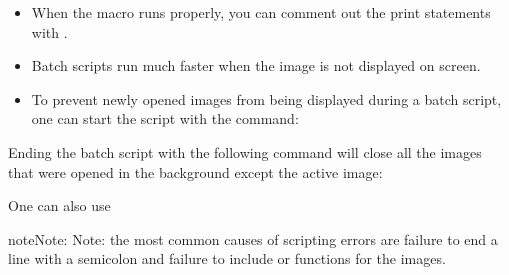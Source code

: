 \documentclass[letterpaper,10pt,english]{jupyterBook}
\begin{document}
\sphinxAtStartPar
{}
\begin{itemize}
\item {} 
\sphinxAtStartPar
When the macro runs properly, you can comment out the print statements with \sphinxcode{\sphinxupquote{//}}.

\item {} 
\sphinxAtStartPar
Batch scripts run much faster when the image is not displayed on screen.

\item {} 
\sphinxAtStartPar
To prevent newly opened images from being displayed during a batch script, one can start the script with the command:

\end{itemize}

\begin{sphinxVerbatim}[commandchars=\\\{\}]
    
\end{sphinxVerbatim}

\sphinxAtStartPar
Ending the batch script with the following command will close all the images that were opened in the background except the active image:

\begin{sphinxVerbatim}[commandchars=\\\{\}]
       
\end{sphinxVerbatim}

\sphinxAtStartPar
One can also use

\begin{sphinxVerbatim}[commandchars=\\\{\}]
     
\end{sphinxVerbatim}

\begin{sphinxadmonition}{note}{Note:}
\sphinxAtStartPar
Note: the most common causes of scripting errors are failure to end a line with a semicolon and failure to include  or  functions for the images.
\end{sphinxadmonition}
\end{document}
